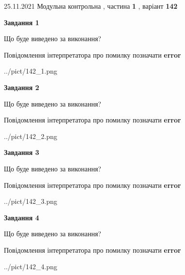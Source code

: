 \documentclass[10pt, ukrainian]{article}
\begin{document}
{25.11.2021 Модульна контрольна , частина \textbf { 1 }, варіант  \No \textbf { 142 }\par}
{
\begin {large}

{\begin {center}\textbf{Завдання 1}\end {center}}\par
Що буде виведено за виконання? \par
Повідомлення інтерпретатора про помилку позначати \textbf{error}

\begin{center}
	{../pict/142_1.png}
\end{center}
\newpage

{\begin {center}\textbf{Завдання 2}\end {center}}\par
Що буде виведено за виконання? \par
Повідомлення інтерпретатора про помилку позначати \textbf{error}

\begin{center}
	{../pict/142_2.png}
\end{center}
\newpage

{\begin {center}\textbf{Завдання 3}\end {center}}\par
Що буде виведено за виконання? \par
Повідомлення інтерпретатора про помилку позначати \textbf{error}

\begin{center}
	{../pict/142_3.png}
\end{center}
\newpage

{\begin {center}\textbf{Завдання 4}\end {center}}\par
Що буде виведено за виконання? \par
Повідомлення інтерпретатора про помилку позначати \textbf{error}

\begin{center}
	{../pict/142_4.png}
\end{center}
\newpage


\end{large}}
\end{document}
